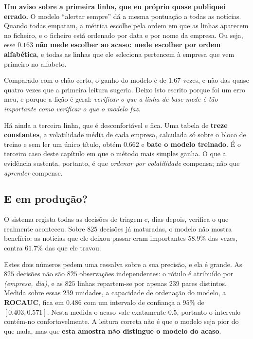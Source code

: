 \begin{tcolorbox}[colback=orange!5, colframe=orange!45, boxrule=0.5pt, arc=2pt]
\textbf{Um aviso sobre a primeira linha, que eu próprio quase publiquei errado.} O modelo
``alertar sempre'' dá a mesma pontuação a todas as notícias. Quando todas empatam, a métrica escolhe
pela ordem em que as linhas aparecem no ficheiro, e o ficheiro está ordenado por data e por nome
da empresa. Ou seja, esse $0.163$ \textbf{não mede escolher ao acaso: mede escolher por ordem
alfabética}, e todas as linhas que ele seleciona pertencem à empresa que vem primeiro no alfabeto.

Comparado com o chão certo, o ganho do modelo é de $1.67$ vezes, e não das quase quatro vezes que a
primeira leitura sugeria. Deixo isto escrito porque foi um erro meu, e porque a lição é geral:
\emph{verificar o que a linha de base mede é tão importante como verificar o que o modelo faz}.
\end{tcolorbox}

Há ainda a terceira linha, que é desconfortável e fica. Uma tabela de \textbf{treze constantes},
a volatilidade média de cada empresa, calculada só sobre o bloco de treino e sem ler um único
título, obtém $0.662$ e \textbf{bate o modelo treinado}. É o terceiro caso deste capítulo em que o
método mais simples ganha. O que a evidência sustenta, portanto, é
que \emph{ordenar por volatilidade} compensa; não que \emph{aprender} compense.

\subsection{E em produção?}

O sistema regista todas as decisões de triagem e, dias depois, verifica o que realmente aconteceu.
Sobre $825$ decisões já maturadas, o modelo não mostra benefício: as notícias que ele deixou passar
eram importantes $58.9\%$ das vezes, contra $61.7\%$ das que ele travou.

Estes dois números pedem uma ressalva sobre a sua precisão, e ela é grande. As $825$ decisões não
são $825$ observações independentes: o rótulo é atribuído por \emph{(empresa, dia)}, e as $825$
linhas repartem-se por apenas $239$ pares distintos. Medida sobre essas $239$ unidades, a capacidade
de ordenação do modelo, a \textbf{\gls{ROCAUC}}, fica em $0.486$ com um intervalo de confiança a
$95\%$ de $[0.403, 0.571]$. Nesta medida o acaso vale exatamente $0.5$, portanto o intervalo
contém-no confortavelmente. A leitura correta não é que o modelo seja pior do que
nada, mas que \textbf{esta amostra não distingue o modelo do acaso}.

